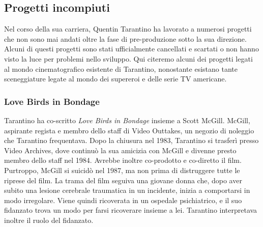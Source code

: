 \documentclass[12pt]{article} %
\begin{document}
\subsection{Progetti incompiuti}
\begin{flushleft}
    Nel corso della sua carriera, Quentin Tarantino ha lavorato a numerosi progetti che non sono mai andati oltre la fase di pre-produzione sotto la sua direzione. Alcuni di questi progetti sono stati ufficialmente cancellati e scartati o non hanno visto la luce per problemi nello sviluppo. Qui citeremo alcuni dei progetti legati al mondo cinematografico esistente di Tarantino, nonostante esistano tante sceneggiature legate al mondo dei supereroi e delle serie TV americane.
\subsubsection*{Love Birds in Bondage}
Tarantino ha co-scritto \textit{Love Birds in Bondage} insieme a Scott McGill. McGill, aspirante regista e membro dello staff di Video Outtakes, un negozio di noleggio che Tarantino frequentava. Dopo la chiusura nel 1983, Tarantino si trasferì presso Video Archives, dove continuò la sua amicizia con McGill e divenne presto membro dello staff nel 1984.
Avrebbe inoltre co-prodotto e co-diretto il film. Purtroppo, McGill si suicidò nel 1987, ma non prima di distruggere tutte le riprese del film. La trama del film seguiva una giovane donna che, dopo aver subito una lesione cerebrale traumatica in un incidente, inizia a comportarsi in modo irregolare. Viene quindi ricoverata in un ospedale psichiatrico, e il suo fidanzato trova un modo per farsi ricoverare insieme a lei. Tarantino interpretava inoltre il ruolo del fidanzato.

\end{flushleft}
\end{document}
